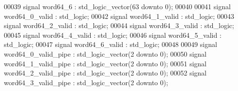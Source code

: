 \begin{DoxyCode}
00039 \textcolor{keywordflow}{signal} \textcolor{vhdlchar}{word64_6}               \textcolor{vhdlchar}{:} \textcolor{comment}{std\_logic\_vector}\textcolor{vhdlchar}{(}\textcolor{vhdllogic}{}\textcolor{vhdllogic}{63} \textcolor{keywordflow}{downto} \textcolor{vhdllogic}{}\textcolor{vhdllogic}{0}\textcolor{vhdlchar}{)};
00040       
00041 \textcolor{keywordflow}{signal} \textcolor{vhdlchar}{word64_0_valid}         \textcolor{vhdlchar}{:} \textcolor{comment}{std\_logic};
00042 \textcolor{keywordflow}{signal} \textcolor{vhdlchar}{word64_1_valid}         \textcolor{vhdlchar}{:} \textcolor{comment}{std\_logic};
00043 \textcolor{keywordflow}{signal} \textcolor{vhdlchar}{word64_2_valid}         \textcolor{vhdlchar}{:} \textcolor{comment}{std\_logic};
00044 \textcolor{keywordflow}{signal} \textcolor{vhdlchar}{word64_3_valid}         \textcolor{vhdlchar}{:} \textcolor{comment}{std\_logic};
00045 \textcolor{keywordflow}{signal} \textcolor{vhdlchar}{word64_4_valid}         \textcolor{vhdlchar}{:} \textcolor{comment}{std\_logic};
00046 \textcolor{keywordflow}{signal} \textcolor{vhdlchar}{word64_5_valid}         \textcolor{vhdlchar}{:} \textcolor{comment}{std\_logic};
00047 \textcolor{keywordflow}{signal} \textcolor{vhdlchar}{word64_6_valid}         \textcolor{vhdlchar}{:} \textcolor{comment}{std\_logic};
00048 
00049 \textcolor{keywordflow}{signal} \textcolor{vhdlchar}{word64_0_valid_pipe}    \textcolor{vhdlchar}{:} \textcolor{comment}{std\_logic\_vector}\textcolor{vhdlchar}{(}\textcolor{vhdllogic}{}\textcolor{vhdllogic}{2} \textcolor{keywordflow}{downto} \textcolor{vhdllogic}{}\textcolor{vhdllogic}{0}\textcolor{vhdlchar}{)};
00050 \textcolor{keywordflow}{signal} \textcolor{vhdlchar}{word64_1_valid_pipe}    \textcolor{vhdlchar}{:} \textcolor{comment}{std\_logic\_vector}\textcolor{vhdlchar}{(}\textcolor{vhdllogic}{}\textcolor{vhdllogic}{2} \textcolor{keywordflow}{downto} \textcolor{vhdllogic}{}\textcolor{vhdllogic}{0}\textcolor{vhdlchar}{)};
00051 \textcolor{keywordflow}{signal} \textcolor{vhdlchar}{word64_2_valid_pipe}    \textcolor{vhdlchar}{:} \textcolor{comment}{std\_logic\_vector}\textcolor{vhdlchar}{(}\textcolor{vhdllogic}{}\textcolor{vhdllogic}{2} \textcolor{keywordflow}{downto} \textcolor{vhdllogic}{}\textcolor{vhdllogic}{0}\textcolor{vhdlchar}{)};
00052 \textcolor{keywordflow}{signal} \textcolor{vhdlchar}{word64_3_valid_pipe}    \textcolor{vhdlchar}{:} \textcolor{comment}{std\_logic\_vector}\textcolor{vhdlchar}{(}\textcolor{vhdllogic}{}\textcolor{vhdllogic}{2} \textcolor{keywordflow}{downto} \textcolor{vhdllogic}{}\textcolor{vhdllogic}{0}\textcolor{vhdlchar}{)};

\end{DoxyCode}
